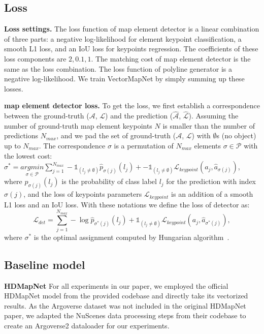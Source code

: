 \documentclass{article}
\theoremstyle{plain}
\theoremstyle{definition}
\theoremstyle{remark}
\begin{document}
\subsection{Loss}
\label{subsec:loss}
\noindent\textbf{Loss settings.} The loss function of map element detector is a linear combination of three parts: a negative log-likelihood for element keypoint classification, a smooth L1 loss, and an IoU loss for keypoints regression. The coefficients of these loss components are $2,0.1,1$. The matching cost of map element detector is the same as the loss combination.
The loss function of polyline generator is a negative log-likelihood. 
We train VectorMapNet by simply summing up these losses.

\noindent\textbf{map element detector loss.}
To get the loss, we first establish a correspondence between the ground-truth ($\mathcal{A}$, $\bm{\mathcal{L}}$) and the prediction ($\hat{\mathcal{A}}$, $\hat{\bm{\mathcal{L}}}$). Assuming the number of ground-truth map element keypoints $N$ is smaller than the number of predictions $N_{max}$, and we pad the set of ground-truth ($\mathcal{A}$, $\bm{\mathcal{L}}$) with $\emptyset$s (no object) up to $N_{max}$. The correspondence $\sigma$ is a permutation of $N_{max}$ elements $\sigma\in\mathcal{P}$ with the lowest cost: 
 $\sigma^{\ast} = \underset{\sigma\in \mathcal{P}}{argmin} \sum_{j=1}^{N_{max}} -\mathds{1}_{(l_j \neq \emptyset)} \hat{p}_{\sigma(j)} (l_j) + -\mathds{1}_{(l_j \neq \emptyset)}\bm{\mathcal{L}}_{keypoint}(a_j, \hat{a}_{\sigma(j)})$, where $\hat{p}_{\sigma(j)}(l_j)$ is the probability of class label $l_j$ for the prediction with index $\sigma(j)$, and the loss of keypoints parameters $\bm{\mathcal{L}}_{keypoint}$ is an addition of a smooth L1 loss and an IoU loss. With these notations we define the loss of detector as: 
 $$\bm{\mathcal{L}}_{det} = \sum_{j=1}^{N_{max}} -\log \hat{p}_{\sigma^{\ast}(j)}(l_j) + \mathds{1}_{(l_j \neq \emptyset)} \bm{\mathcal{L}}_{keypoint}(a_j,\hat{a}_{\sigma^{\ast}(j)}),$$ where $\sigma^{\ast}$ is the optimal assignment computed by Hungarian algorithm~\citep{kuhn1955hungarian}.

 \subsection{Baseline model}
 \label{sec: baseline model settings}
 \noindent\textbf{HDMapNet}
 For all experiments in our paper, we employed the official HDMapNet model from the provided codebase and directly take its vectorized results. As the Argoverse dataset was not included in the original HDMapNet paper, we adapted the NuScenes data processing steps from their codebase to create an Argoverse2 dataloader for our experiments. 
 
\end{document}
